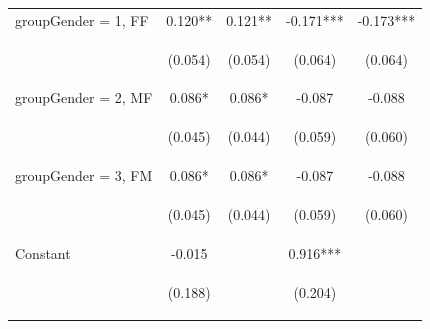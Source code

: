 \documentclass{article} %
\begin{document}
\begin{table}[H]
\begin{center}
\begin{tabular}{lcccc}
groupGender = 1, FF & 0.120** & 0.121** & -0.171*** & -0.173*** \\
\vspace{4pt} & \begin{footnotesize}(0.054)\end{footnotesize} & \begin{footnotesize}(0.054)\end{footnotesize} & \begin{footnotesize}(0.064)\end{footnotesize} & \begin{footnotesize}(0.064)\end{footnotesize} \\
groupGender = 2, MF & 0.086* & 0.086* & -0.087 & -0.088 \\
\vspace{4pt} & \begin{footnotesize}(0.045)\end{footnotesize} & \begin{footnotesize}(0.044)\end{footnotesize} & \begin{footnotesize}(0.059)\end{footnotesize} & \begin{footnotesize}(0.060)\end{footnotesize} \\
groupGender = 3, FM & 0.086* & 0.086* & -0.087 & -0.088 \\
\vspace{4pt} & \begin{footnotesize}(0.045)\end{footnotesize} & \begin{footnotesize}(0.044)\end{footnotesize} & \begin{footnotesize}(0.059)\end{footnotesize} & \begin{footnotesize}(0.060)\end{footnotesize} \\
Constant & -0.015 &  & 0.916*** &  \\
 & \begin{footnotesize}(0.188)\end{footnotesize} & \begin{footnotesize}\end{footnotesize} & \begin{footnotesize}(0.204)\end{footnotesize} & \begin{footnotesize}\end{footnotesize} \\

\end{tabular}
\end{center}
\end{table}
\end{document}
